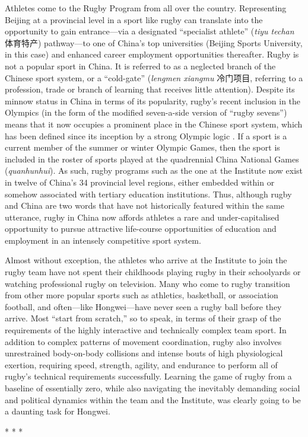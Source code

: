 Athletes come to the Rugby Program from all over the country.  Representing Beijing at a provincial level in a sport like rugby can translate into the opportunity to gain entrance---via a designated ``specialist athlete'' (\textit{tiyu techan} 体育特产) pathway---to one of China's top universities (Beijing Sports University, in this case) and enhanced career employment opportunities thereafter.  Rugby is not a popular sport in China. It is referred to as a neglected branch of the Chinese sport system, or a ``cold-gate'' (\textit{lengmen xiangmu} 冷门项目, referring to a profession, trade or branch of learning that receives little attention). Despite its minnow status in China in terms of its popularity, rugby's recent inclusion in the Olympics (in the form of the modified seven-a-side version of ``rugby sevens'') means that it now occupies a prominent place in the Chinese sport system, which has been defined since its inception by a strong Olympic logic \citep{Brownell2008}.  If a sport is a current member of the summer or winter Olympic Games, then the sport is included in the roster of sports played at the quadrennial China National Games (\textit{quanhunhui}). As such, rugby programs such as the one at the Institute now exist in twelve of China's 34 provincial level regions, either embedded within or somehow associated with tertiary education institutions. Thus, although rugby and China are two words that have not historically featured within the same utterance, rugby in China now affords athletes a rare and under-capitalised opportunity to pursue attractive life-course opportunities of education and employment in an intensely competitive sport system.

Almost without exception, the athletes who arrive at the Institute to join the rugby team have not spent their childhoods playing rugby in their schoolyards or watching professional rugby on television. Many who come to rugby transition from other more popular sports such as athletics, basketball, or association football, and often---like Hongwei---have never seen a rugby ball before they arrive.  Most ``start from scratch,'' so to speak, in terms of their grasp of the requirements of the highly interactive and technically complex team sport. In addition to complex patterns of movement coordination, rugby also involves unrestrained body-on-body collisions and intense bouts of high physiological exertion, requiring speed, strength, agility, and endurance to perform all of rugby's technical requirements successfully.  Learning the game of rugby from a baseline of essentially zero, while also navigating the inevitably demanding  social and political dynamics within the team and the Institute, was clearly going to be a daunting task for Hongwei.
\begin{center}
  * * *
\end{center}

